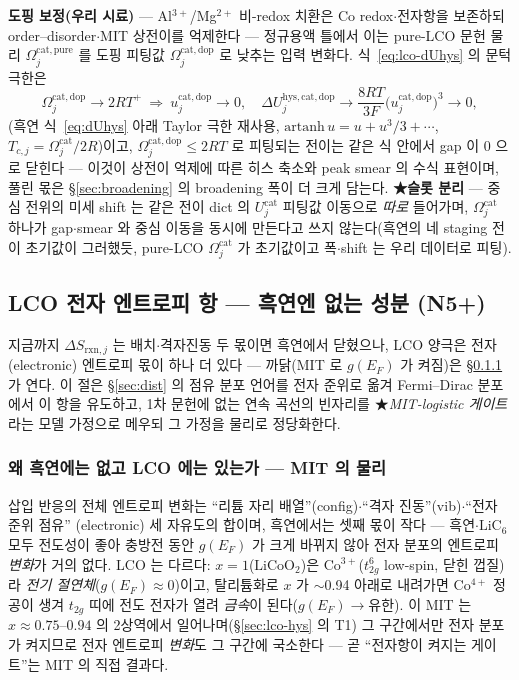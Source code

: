 \documentclass[11pt,a4paper]{article}
\newcommand{\rxn}{\mathrm{rxn}}
\newcommand{\hys}{\mathrm{hys}}
\begin{document}
\textbf{도핑 보정(우리 시료)} —
Al$^{3+}$/Mg$^{2+}$ 비-redox 치환은 Co redox$\cdot$전자항을 보존하되 order--disorder$\cdot$MIT 상전이를
억제한다 — 정규용액 틀에서 이는 pure-LCO 문헌 물리 $\Omega_j^\mathrm{cat,pure}$ 를 도핑 피팅값
$\Omega_j^\mathrm{cat,dop}$ 로 낮추는 입력 변화다. 식~\eqref{eq:lco-dUhys} 의 문턱 극한은
\begin{equation}
\Omega_j^\mathrm{cat,dop}\to2RT^+\ \Longrightarrow\
u_j^\mathrm{cat,dop}\to0,\quad
\Delta U_j^{\hys,\mathrm{cat,dop}}\to\frac{8RT}{3F}\big(u_j^\mathrm{cat,dop}\big)^3\to0,
\label{eq:lco-dope}
\end{equation}
(흑연 식~\eqref{eq:dUhys} 아래 Taylor 극한 재사용, $\mathrm{artanh}\,u=u+u^3/3+\cdots$,
$T_{c,j}=\Omega_j^\mathrm{cat}/2R$)이고, $\Omega_j^\mathrm{cat,dop}\le2RT$ 로 피팅되는 전이는 같은 식 안에서
gap 이 0 으로 닫힌다 — 이것이 상전이 억제에 따른 히스 축소와 peak smear 의 수식 표현이며, 풀린 몫은
\S\ref{sec:broadening} 의 broadening 폭이 더 크게 담는다. \textbf{★슬롯 분리} — 중심 전위의 미세 shift 는
같은 전이 dict 의 $U_j^\mathrm{cat}$ 피팅값 이동으로 \emph{따로} 들어가며, $\Omega_j^\mathrm{cat}$ 하나가
gap$\cdot$smear 와 중심 이동을 동시에 만든다고 쓰지 않는다(흑연의 네 staging 전이 초기값이 그러했듯,
pure-LCO $\Omega_j^\mathrm{cat}$ 가 초기값이고 폭$\cdot$shift 는 우리 데이터로 피팅).

\subsection{LCO 전자 엔트로피 항 — 흑연엔 없는 성분 (N5+)}\label{sec:lco-electronic}
지금까지 $\Delta S_{\rxn,j}$ 는 배치$\cdot$격자진동 두 몫이면 흑연에서 닫혔으나, LCO 양극은 전자(electronic) 엔트로피
몫이 하나 더 있다 — 까닭(MIT 로 $g(E_F)$ 가 켜짐)은 \S\ref{sec:lco-why} 가 연다.
이 절은 \S\ref{sec:dist} 의 점유 분포 언어를 전자 준위로 옮겨 Fermi--Dirac 분포에서 이 항을 유도하고,
1차 문헌에 없는 연속 곡선의 빈자리를 ★\emph{MIT-logistic 게이트}라는 모델 가정으로 메우되 그 가정을 물리로
정당화한다.

\subsubsection{왜 흑연에는 없고 LCO 에는 있는가 --- MIT 의 물리}\label{sec:lco-why}
삽입 반응의 전체 엔트로피 변화는 ``리튬 자리 배열''(config)$\cdot$``격자 진동''(vib)$\cdot$``전자 준위 점유''
(electronic) 세 자유도의 합이며, 흑연에서는 셋째 몫이 작다 — 흑연$\cdot$$\mathrm{LiC_6}$ 모두 전도성이 좋아
충방전 동안 $g(E_F)$ 가 크게 바뀌지 않아 전자 분포의 엔트로피 \emph{변화}가 거의 없다. LCO 는 다르다:
$x{=}1$($\mathrm{LiCoO_2}$)은 Co$^{3+}$($t_{2g}^6$ low-spin, 닫힌 껍질)라 \emph{전기 절연체}($g(E_F)\!\approx\!0$)이고,
탈리튬화로 $x$ 가 $\sim$0.94 아래로 내려가면 Co$^{4+}$ 정공이 생겨 $t_{2g}$ 띠에 전도 전자가 열려 \emph{금속}이
된다($g(E_F)\!\to\!$유한)\cite{menetrier1999,motohashi2009}. 이 MIT 는 $x\approx0.75$--$0.94$ 의 2상역에서
일어나며(\S\ref{sec:lco-hys} 의 T1) 그 구간에서만 전자 분포가 켜지므로 전자 엔트로피 \emph{변화}도 그 구간에
국소한다 — 곧 ``전자항이 켜지는 게이트''는 MIT 의 직접 결과다.
\end{document}
